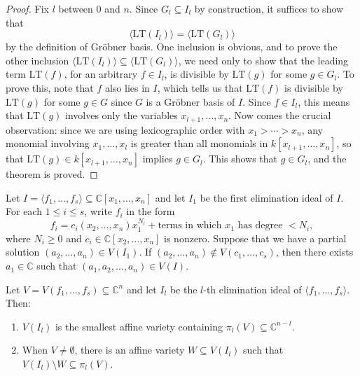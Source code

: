 \documentclass[12pt]{article}
\begin{document}
\begin{proof}
	Fix \( l \) between \( 0 \) and \( n \). Since \( G_l \subseteq I_l \) by construction, it suffices to show that
	\[
		\langle \mathrm{LT}(I_l) \rangle = \langle \mathrm{LT}(G_l) \rangle
	\]
	by the definition of Gr\"obner basis. One inclusion is obvious, and to prove the other inclusion \( \langle \mathrm{LT}(I_l) \rangle \subseteq \langle \mathrm{LT}(G_l) \rangle \), we need only to show that the leading term \( \mathrm{LT}(f) \), for an arbitrary \( f \in I_l \), is divisible by \( \mathrm{LT}(g) \) for some \( g \in G_l \). To prove this, note that \( f \) also lies in \( I \), which tells us that \( \mathrm{LT}(f) \) is divisible by \( \mathrm{LT}(g) \) for some \( g \in G \) since \( G \) is a Gr\"obner basis of \( I \). Since \( f \in I_l \), this means that \( \mathrm{LT}(g) \) involves only the variables \( x_{l+1}, \ldots, x_n \). Now comes the crucial observation: since we are using lexicographic order with \( x_1 > \cdots > x_n \), any monomial involving \( x_1, \ldots, x_l \) is greater than all monomials in \( k[x_{l+1}, \ldots, x_n] \), so that \( \mathrm{LT}(g) \in k[x_{l+1}, \ldots, x_n] \) implies \( g \in G_l \). This shows that \( g \in G_l \), and the theorem is proved.
\end{proof}

\begin{theorem}
	Let \( I = \langle f_1, \ldots, f_s \rangle \subseteq \mathbb{C}[x_1, \ldots, x_n] \) and let \( I_1 \) be the first elimination ideal of \( I \). For each \( 1 \leq i \leq s \), write \( f_i \) in the form
	\[
		f_i = c_i(x_2, \ldots, x_n) x_1^{N_i} + \text{terms in which } x_1 \text{ has degree } < N_i,
	\]
	where \( N_i \geq 0 \) and \( c_i \in \mathbb{C}[x_2, \ldots, x_n] \) is nonzero. Suppose that we have a partial solution \( (a_2, \ldots, a_n) \in V(I_1) \). If \( (a_2, \ldots, a_n) \notin V(c_1, \ldots, c_s) \), then there exists \( a_1 \in \mathbb{C} \) such that \( (a_1, a_2, \ldots, a_n) \in V(I) \).
\end{theorem}

\begin{theorem}
	Let \( V = V(f_1, \ldots, f_s) \subseteq \mathbb{C}^n \) and let \( I_l \) be the \( l \)-th elimination ideal of \( \langle f_1, \ldots, f_s \rangle \). Then:
	\begin{enumerate}
		\item \( V(I_l) \) is the smallest affine variety containing \( \pi_l(V) \subseteq \mathbb{C}^{n-l} \).
		\item When \( V \neq \emptyset \), there is an affine variety \( W \subseteq V(I_l) \) such that \( V(I_l) \setminus W \subseteq \pi_l(V) \).
	\end{enumerate}
\end{theorem}
\end{document}

